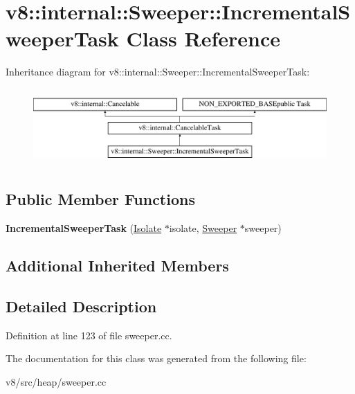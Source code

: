 \hypertarget{classv8_1_1internal_1_1Sweeper_1_1IncrementalSweeperTask}{}\section{v8\+:\+:internal\+:\+:Sweeper\+:\+:Incremental\+Sweeper\+Task Class Reference}
\label{classv8_1_1internal_1_1Sweeper_1_1IncrementalSweeperTask}
Inheritance diagram for v8\+:\+:internal\+:\+:Sweeper\+:\+:Incremental\+Sweeper\+Task\+:\begin{figure}[H]
\begin{center}
\leavevmode
\includegraphics[height=2.947368cm]{classv8_1_1internal_1_1Sweeper_1_1IncrementalSweeperTask}
\end{center}
\end{figure}
\subsection*{Public Member Functions}
\begin{DoxyCompactItemize}
\item 
\mbox{\label{classv8_1_1internal_1_1Sweeper_1_1IncrementalSweeperTask_ad603ae7a6ebeae00dbbedc9513c41ea8}} 
{\bfseries Incremental\+Sweeper\+Task} (\mbox{\hyperlink{classv8_1_1internal_1_1Isolate}{Isolate}} $\ast$isolate, \mbox{\hyperlink{classv8_1_1internal_1_1Sweeper}{Sweeper}} $\ast$sweeper)
\end{DoxyCompactItemize}
\subsection*{Additional Inherited Members}


\subsection{Detailed Description}


Definition at line 123 of file sweeper.\+cc.



The documentation for this class was generated from the following file\+:\begin{DoxyCompactItemize}
\item 
v8/src/heap/sweeper.\+cc\end{DoxyCompactItemize}
